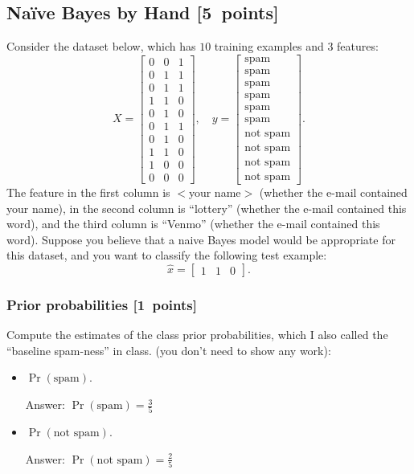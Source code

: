 \documentclass{article}
\newcommand{\blu}[1]{{\textcolor{blu}{#1}}}
\newcommand{\gre}[1]{\textcolor{gre}{#1}}
\newcommand\ans[1]{\par\gre{Answer: #1}}
\let\ask\blu
\newcommand\pts[1]{\textcolor{pointscolour}{[#1~points]}}
\begin{document}
    \subsection{Na\"ive Bayes by Hand \pts{5}}

    Consider the dataset below, which has $10$ training examples and $3$ features:
    \[
    X = \begin{bmatrix}
        0 & 0 & 1\\
        0 & 1 & 1\\
        0 & 1 & 1\\
        1 & 1 & 0\\
        0 & 1 & 0\\
        0 & 1 & 1\\
        0 & 1 & 0\\
        1 & 1 & 0\\
        1 & 0 & 0\\
        0 & 0 & 0
    \end{bmatrix},
    \quad y = \begin{bmatrix}
        \text{spam}\\
        \text{spam}\\
        \text{spam}\\
        \text{spam}\\
        \text{spam}\\
        \text{spam}\\
        \text{not spam}\\
        \text{not spam}\\
        \text{not spam}\\
        \text{not spam}
    \end{bmatrix}.
    \]
    The feature in the first column is $<$your name$>$ (whether the e-mail contained your name), in the second column is ``lottery'' (whether the e-mail contained this word), and the third column is ``Venmo'' (whether the e-mail contained this word).
    Suppose you believe that a naive Bayes model would be appropriate for this dataset, and you want to classify the following test example:
    \[
    \hat{x} = \begin{bmatrix}1 & 1 & 0\end{bmatrix}.
    \]

    \subsubsection{Prior probabilities \pts{1}}
    \ask{Compute the estimates of the class prior probabilities, which I also called the ``baseline spam-ness'' in class.} (you don't need to show any work):
    \begin{itemize}
        \item $\Pr(\text{spam})$.
        \ans{$\Pr(\text{spam}) = \frac{3}{5}$}
        \item $\Pr(\text{not spam})$.
        \ans{$\Pr(\text{not spam}) = \frac{2}{5}$}
    \end{itemize}
\end{document}
